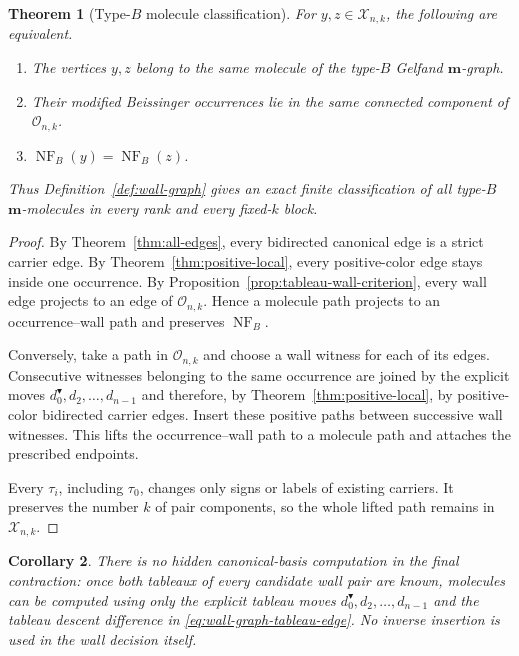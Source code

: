 \documentclass[11pt]{article}
\newtheorem{theorem}{Theorem}[section]
\newtheorem{corollary}[theorem]{Corollary}
\theoremstyle{definition}
\theoremstyle{remark}
\newcommand{\NF}{\operatorname{NF}}
\newcommand{\cO}{\mathcal O}
\newcommand{\cX}{\mathcal X}
\newcommand{\mgraph}{\mathbf m}
\begin{document}
\begin{theorem}[Type-$B$ molecule classification]
\label{thm:classification}
For $y,z\in\cX_{n,k}$, the following are equivalent.
\begin{enumerate}[label=\textup{(\roman*)}]
\item The vertices $y,z$ belong to the same molecule of the type-$B$
Gelfand $\mgraph$-graph.
\item Their modified Beissinger occurrences lie in the same connected
component of $\cO_{n,k}$.
\item $\NF_B(y)=\NF_B(z)$.
\end{enumerate}
Thus Definition~\ref{def:wall-graph} gives an exact finite classification
of all type-$B$ $\mgraph$-molecules in every rank and every fixed-$k$
block.
\end{theorem}

\begin{proof}
By Theorem~\ref{thm:all-edges}, every bidirected canonical edge is a strict
carrier edge.  By Theorem~\ref{thm:positive-local}, every positive-color
edge stays inside one occurrence.  By
Proposition~\ref{prop:tableau-wall-criterion}, every wall edge projects to
an edge of $\cO_{n,k}$.  Hence a molecule path projects to an occurrence--wall path
and preserves $\NF_B$.

Conversely, take a path in $\cO_{n,k}$ and choose a wall witness for each
of its edges.  Consecutive witnesses belonging to the same occurrence are
joined by the explicit moves $d_0^{\blacktriangledown},d_2,\ldots,d_{n-1}$ and
therefore, by Theorem~\ref{thm:positive-local}, by positive-color
bidirected carrier edges.  Insert these positive paths between successive
wall witnesses.  This lifts the occurrence--wall path to a molecule path
and attaches the prescribed endpoints.

Every $\tau_i$, including $\tau_0$, changes only signs or labels of
existing carriers.  It preserves the number $k$ of pair components, so
the whole lifted path remains in $\cX_{n,k}$.
\end{proof}

\begin{corollary}
There is no hidden canonical-basis computation in the final contraction:
once both tableaux of every candidate wall pair are known, molecules can
be computed using only the explicit tableau moves
$d_0^{\blacktriangledown},d_2,\ldots,d_{n-1}$ and the tableau descent
difference in \eqref{eq:wall-graph-tableau-edge}.  No inverse insertion
is used in the wall decision itself.
\end{corollary}
\end{document}
